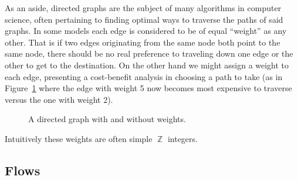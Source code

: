\documentclass{amsart}
\DeclareMathOperator{\Z}{\mathbb{Z}}
\theoremstyle{plain}
\theoremstyle{remark}
\theoremstyle{definition}
\begin{document}
As an aside, directed graphs are the subject of many algorithms in computer
science, often pertaining to finding optimal ways to traverse the paths of said
graphs. In some models each edge is considered to be of equal ``weight'' as any
other. That is if two edges originating from the same node both point to the
same node, there should be no real preference to traveling down one edge or the
other to get to the destination. On the other hand we might assign a weight to
each edge, presenting a cost-benefit analysis in choosing a path to take (as in
Figure~\ref{fig:path-finding} where the edge with weight 5 now becomes most
expensive to traverse versus the one with weight 2).
\begin{figure}[ht]
  \hspace{1in}
  \caption{A directed graph with and without weights.}
  \label{fig:path-finding}
\end{figure}
Intuitively these weights are often simple $\Z$ integers.

\subsection{Flows}
\end{document}
